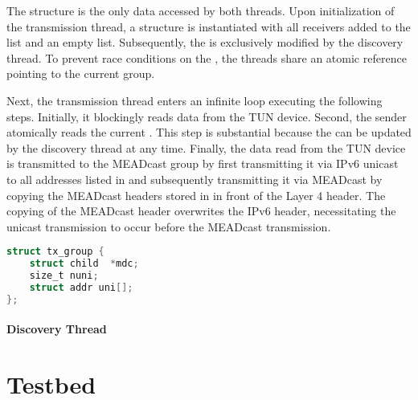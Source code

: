 The  structure is the only data accessed by both threads.
Upon initialization of the transmission thread, a 
    structure is instantiated with all receivers added to the 
    list and an empty  list.
Subsequently, the  is exclusively modified by the discovery
    thread.
To prevent race conditions on the , the threads share an
    atomic reference pointing to the current group.

Next, the transmission thread enters an infinite loop executing the following
    steps.
Initially, it blockingly reads data from the TUN device.
Second, the sender atomically reads the current .
This step is substantial because the  can be updated by
    the discovery thread at any time.
Finally, the data read from the TUN device is transmitted to the MEADcast group
    by first transmitting it via IPv6 unicast to all addresses listed in
     and subsequently transmitting it via MEADcast by copying
    the MEADcast headers stored in  in front of the Layer 4
    header.
The copying of the MEADcast header overwrites the IPv6 header, necessitating
    the unicast transmission to occur before the MEADcast transmission.

\begin{lstlisting}[language=C, caption=TX\_group structure, label={lst:txg_struct}]
struct tx_group {
    struct child  *mdc;
    size_t nuni;
    struct addr uni[];
};
\end{lstlisting}


\paragraph{Discovery Thread} %
\label{par:Discovery Thread}






\section{Testbed} %
\label{sec:Testbed_Implementation}


